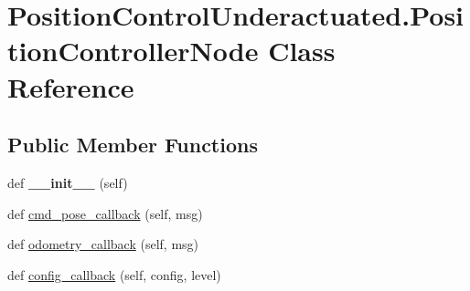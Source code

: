 \hypertarget{classPositionControlUnderactuated_1_1PositionControllerNode}{}\section{Position\+Control\+Underactuated.\+Position\+Controller\+Node Class Reference}
\label{classPositionControlUnderactuated_1_1PositionControllerNode}
\subsection*{Public Member Functions}
\begin{DoxyCompactItemize}
\item 
\mbox{\label{classPositionControlUnderactuated_1_1PositionControllerNode_acb2f578b4fe1ac6c946984fc872f766b}} 
def {\bfseries \+\_\+\+\_\+init\+\_\+\+\_\+} (self)
\item 
def \hyperlink{classPositionControlUnderactuated_1_1PositionControllerNode_a0b97b85e7356c21f63a83005268d2d41}{cmd\+\_\+pose\+\_\+callback} (self, msg)
\item 
def \hyperlink{classPositionControlUnderactuated_1_1PositionControllerNode_a33466241b66a2b487f2def659093a605}{odometry\+\_\+callback} (self, msg)
\item 
def \hyperlink{classPositionControlUnderactuated_1_1PositionControllerNode_aae800b3fd982ab0b87a0fbc4f7c543f8}{config\+\_\+callback} (self, config, level)
\end{DoxyCompactItemize}
